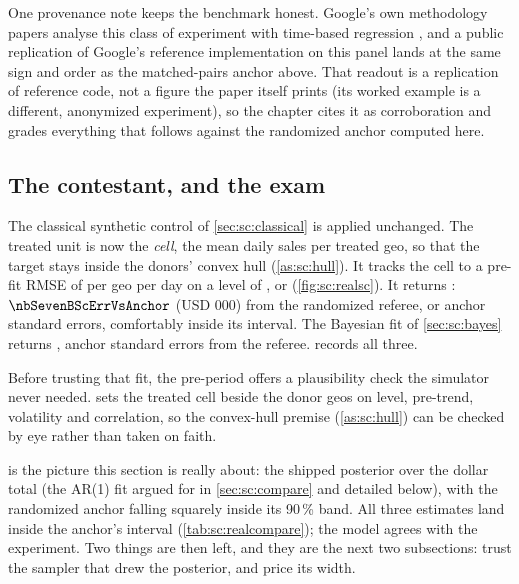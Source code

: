 One provenance note keeps the benchmark honest. Google's own methodology papers analyse this class
of experiment with time-based regression \citep{kerman2017}, and a public replication of Google's
reference implementation on this panel lands at the same sign and order as the matched-pairs anchor
above. That readout is a replication of reference code, not a figure the paper itself prints (its
worked example is a different, anonymized experiment), so the chapter cites it as corroboration and
grades everything that follows against the randomized anchor computed here.

\subsection*{The contestant, and the exam}

The classical synthetic control of \cref{sec:sc:classical} is applied unchanged. The treated unit
is now the \emph{cell}, the mean daily sales per treated geo, so that the target stays inside
the donors' convex hull (\cref{as:sc:hull}). It tracks the cell to a pre-fit RMSE of
\usd{\nbSevenBScPreRmse} per geo per day on a level of \usd{\nbSevenBPreLevel}, or
\pc{\nbSevenBScPreRmsePct} (\cref{fig:sc:realsc}). It returns \kusd{\nbSevenBScTotal}:
$\nbSevenBScErrVsAnchor$ (USD 000) from the randomized referee, or \nbSevenBScAnchorSes{} anchor
standard errors, comfortably inside its interval. The Bayesian fit of \cref{sec:sc:bayes} returns
\kusd{\nbSevenBBayesTotal}, \nbSevenBBayesAnchorSes{} anchor standard errors from the referee.
 records all three.

Before trusting that fit, the pre-period offers a plausibility check the simulator never needed.
 sets the treated cell beside the donor geos on level, pre-trend,
volatility and correlation, so the convex-hull premise (\cref{as:sc:hull}) can be checked by eye
rather than taken on faith.







 is the picture this section is really about: the shipped posterior over
the dollar total (the AR(1) fit argued for in \cref{sec:sc:compare} and detailed below), with the
randomized anchor falling squarely inside its 90\,\% band. All three estimates land inside the
anchor's interval (\cref{tab:sc:realcompare}); the model agrees with the experiment. Two things are
then left, and they are the next two subsections: trust the sampler that drew the posterior, and
price its width.


